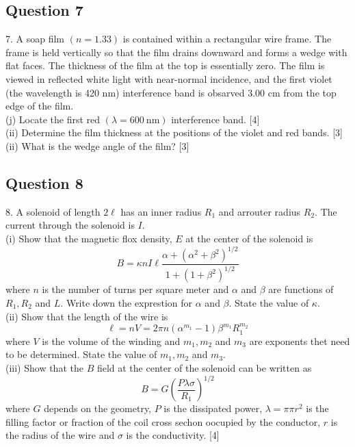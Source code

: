\documentclass{article}
\begin{document}
\subsection{Question 7}

7. A soap film $(n=1.33)$ is contained within a rectangular wire frame. The frame is held vertically so that the film drains downward and forms a wedge with flat faces. The thickness of the film at the top is essentially zero. The film is viewed in reflected white light with near-normal incidence, and the first violet (the wavelength is 420 nm) interference band is obsarved $3.00$ cm from the top edge of the film. \\
(j) Locate the first red $(\lambda=600 \mathrm{~nm})$ interference band. [4] \\
(ii) Determine the film thickness at the positions of the violet and red bands. [3] \\
(ii) What is the wedge angle of the film? [3] \\

\subsection{Question 8}

8. A solenoid of length $2 \ell$ has an inner radius $R_{1}$ and arrouter radius $R_{2}$. The current through the solenoid is $I$. \\
(i) Show that the magnetic flox density, $E$ at the center of the solenoid is
$$
B=\kappa n I \ell \frac{\alpha+\left(\alpha^{2}+\beta^{2}\right)^{1 / 2}}{1+\left(1+\beta^{2}\right)^{1 / 2}}
$$
where $n$ is the number of turns per square meter and $\alpha$ and $\beta$ are functions of $R_{1}, R_{2}$ and $L$. Write down the exprestion for $\alpha$ and $\beta$. State the value of $\kappa$. \\
(ii) Show that the length of the wire is
$$
\ell=n V=2 \pi n\left(\alpha^{m_{1}}-1\right) \beta^{m_{1}} R_{1}^{m_{2}}
$$
where $V$ is the volume of the winding and $m_{1}, m_{2}$ and $m_{3}$ are exponents thet need to be determined. State the value of $m_{1}, m_{2}$ and $m_{3}$. \\
(iii) Show that the $B$ field at the center of the solenoid can be written as
$$
B=G\left(\frac{P \lambda \sigma}{R_{1}}\right)^{1 / 2}
$$
where $G$ depends on the geometry, $P$ is the dissipated power, $\lambda=\pi \pi r^{2}$ is the filling factor or fraction of the coil cross sechon oocupied by the conductor, $r$ is the radius of the wire and $\sigma$ is the conductivity. [4]
\end{document}
